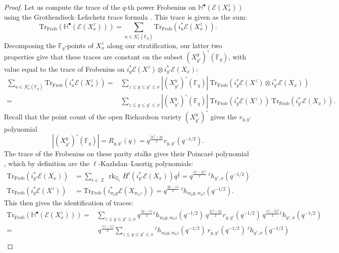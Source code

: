 \documentclass[11pt]{article}
\DeclareMathOperator{\Z}{\mathbb{Z}}
\DeclareMathOperator{\rank}{rk}
\theoremstyle{remark}
\theoremstyle{definition}
\begin{document}
\begin{proof}
Let us compute the trace of the $q$-th power Frobenius on $\mathbb{H}^\bullet(\mathscr{E}(X^z_x))$ using the  Grothendieck--Lefschetz trace formula \cite{De77}. This trace is given as the sum:
\[\text{Tr}_{\text{Frob}}(\mathbb{H}^\bullet(\mathscr{E}(X^z_x)))=\sum_{u\in X^z_x(\mathbb{F}_q)}\text{Tr}_{\text{Frob}}(i_u^*\mathscr{E}(X^z_x)).\]
Decomposing the $\mathbb{F}_q$-points of $X^z_x$ along our stratification, our latter two properties give that these traces are constant on the subset $(X^{y}_{y'})^\circ(\mathbb{F}_q)$, with value equal to the trace of Frobenius on $i_y^*\mathscr{E}(X^z)\otimes i_{y'}^*\mathscr{E}(X_x)$:
\begin{align*}
        \sum_{u\in X^z_x(\mathbb{F}_q)}\text{Tr}_{\text{Frob}}(i_u^*\mathscr{E}(X^z_x))=&
    \sum_{z\leq y\leq y'\leq x}|(X^{y}_{y'})^\circ(\mathbb{F}_q)|~\text{Tr}_{\text{Frob}}(i_{y}^*\mathscr{E}(X^z) \otimes i_{y'}^*\mathscr{E}(X_x))\\
    =&\sum_{z\leq y\leq y'\leq x}|(X^{y}_{y'})^\circ(\mathbb{F}_q)|~\text{Tr}_{\text{Frob}}(i_{y}^*\mathscr{E}(X^z))~  \text{Tr}_{\text{Frob}}(i_{y'}^*\mathscr{E}(X_x)).
    \end{align*}
    Recall that the point count of the open Richardson variety $(X_{y'}^{y})^{\circ}$ gives the $r_{y,y'}$ polynomial
    \[|(X^y_{y'})^\circ(\mathbb{F}_q)|=R_{y,y'}(q)=q^{\frac{|y'|-|y|}{2}}r_{y,y'}(q^{-1/2}).\]
    The trace of the Frobenius on these parity stalks gives their Poincar\'{e} polynomial \cite[\S 1.3.5]{JMW14}, which by definition are the $\ell$-Kazhdan--Lusztig polynomials:
    \begin{align*}
    \text{Tr}_{\text{Frob}}(i_{y'}^*\mathscr{E}(X_x))&=\sum_{i \in \Z}  \rank_{\mathbb{Q}_\ell} H^i (i_{y'}^*\mathscr{E}(X_{x})) q^{\frac{i}{2}}=q^{\frac{|x|-|y'|}{2}}~ {}^{\ell} h_{y',x}(q^{-1/2}) \\
    \text{Tr}_{\text{Frob}}(i_{y}^*\mathscr{E}(X^z))&=\text{Tr}_{\text{Frob}}(i_{w_0y}^*\mathscr{E}(X_{w_0 z}))=q^{\frac{|y|-|z|}{2}}~ {}^{\ell} h_{w_0y,w_0z}(q^{-1/2}). 
    \end{align*}
    This then gives the identification of traces:
    \begin{align*}
        \text{Tr}_{\text{Frob}}(\mathbb{H}^\bullet(\mathscr{E}(X^z_x)))=&\sum_{z \leq y \leq y' \leq x} q^{\frac{|y|-|z|}{2}} {}^{\ell} h_{w_0y,w_0z}(q^{-1/2})~ q^{\frac{|y'|-|y|}{2}}r_{y,y'}(q^{-1/2})~ q^{\frac{|x|-|y'|}{2}} {}^{\ell} h_{y',x}(q^{-1/2})\\
        = &~ q^{\frac{|x|-|z|}{2}}\sum_{z \leq y \leq y' \leq x} {}^{\ell} h_{w_0y,w_0z}(q^{-1/2})~r_{y,y'}(q^{-1/2})~{}^{\ell} h_{y',x}(q^{-1/2})\\

\end{align*}
\end{proof}
\end{document}

